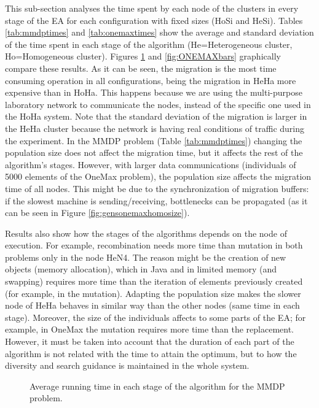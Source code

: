 \documentclass[final,1p,times]{elsarticle}
\begin{document}
This sub-section analyses the time spent by each node of the clusters in every stage of the EA for each configuration with fixed sizes (HoSi and HeSi). Tables \ref{tab:mmdptimes} and \ref{tab:onemaxtimes} show the average and standard deviation of the time spent in each stage of the algorithm (He=Heterogeneous cluster, Ho=Homogeneous cluster). Figures \ref{fig:MMDPbars} and \ref{fig:ONEMAXbars} graphically compare these results. As it can be seen, the migration is the most time consuming operation in all configurations, being the migration in HeHa more expensive than in HoHa. This happens because we are using the multi-purpose laboratory network to communicate the nodes, instead of the specific one used in the HoHa system. Note that the standard deviation of the migration is larger in the HeHa cluster because the network is having real conditions of traffic during the experiment. In the MMDP problem (Table \ref{tab:mmdptimes}) changing the population size does not affect the migration time, but it affects the rest of the algorithm's stages. However, with larger data communications (individuals of 5000 elements of the OneMax problem), the population size affects the migration time of all nodes. This might be due to the synchronization of migration buffers: if the slowest machine is sending/receiving, bottlenecks can be propagated (as it can be seen in Figure \ref{fig:gensonemaxhomosize}). 

Results also show how the stages of the algorithms depends on the node
of execution. For example, recombination needs more time than mutation
in both problems only in the node HeN4. The reason might be the
creation of new objects (memory allocation), which in Java and in
limited memory (and swapping) requires more time than the iteration of
elements previously created (for example, in the mutation). Adapting
the population size makes the slower node of HeHa behaves in similar
way than the other nodes (same time in each stage). Moreover, the size
of the individuals affects to some parts of the EA; for example, in 
OneMax the mutation requires more time than the replacement. However,
it must be taken into account that the duration of each part of the
algorithm is not related with the time to attain the optimum, but to
how the diversity and search guidance is maintained in the whole system.  

\begin{figure}[htb]
\centering
{}
\caption{Average running time in each stage of the algorithm for the MMDP problem.}
\label{fig:MMDPbars}
\end{figure}
\end{document}
